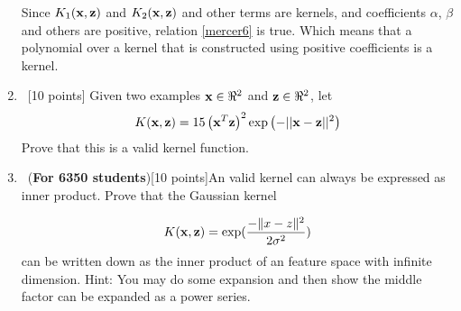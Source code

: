 \begin{enumerate}
Since $K_1({\bf x}, {\bf z})$ and $K_2({\bf x}, {\bf z})$ and other terms are kernels, and coefficients $\alpha$, $\beta$ and others are positive, relation \ref{mercer6} is true. Which means that a polynomial over a kernel that is constructed using positive coefficients is a kernel.

\item~[10 points] Given two examples ${\bf x} \in \Re^2$ and ${\bf z} \in
  \Re^2$, let
  \begin{equation}
    K({\bf x},{\bf z}) = 15\left({\bf x}^T{\bf z}\right)^2 \exp\left(-||{\bf x} - {\bf z}||^2\right)
  \end{equation}
  Prove that this is a valid kernel function.
  
 \item ~(\textbf{For 6350 students})[10 points]An valid kernel can always be  expressed as inner product. Prove that the Gaussian  kernel

$$K({\bf x}, {\bf z}) = \exp(\frac{-\| x -z\|^2}{2 \sigma^2})$$
 can be written down as the inner product of an feature space with infinite dimension. Hint:  You may do some expansion and  then show the middle factor can be expanded as a power series.
 


\end{enumerate}

